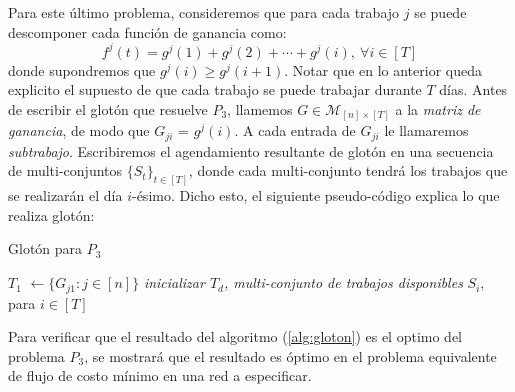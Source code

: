 \documentclass[10pt]{article}
\theoremstyle{plain}
\theoremstyle{definition}
\begin{document}
Para este último problema, consideremos que para cada trabajo $j$ se puede descomponer cada función de ganancia como:
\begin{equation}
\label{eq:desc}
f^j(t) = g^j(1) + g^j(2) + \cdots + g^j(i),\ \forall i \in [T]
\end{equation}
donde supondremos que $g^j(i)\geq g^j(i+1)$. Notar que en lo anterior queda explicito el supuesto de que cada trabajo se puede trabajar durante $T$ días. Antes de escribir el glotón que resuelve $P_3$, llamemos $G\in \mathcal{M}_{[n] \times [T]}$ a la \textit{matriz de ganancia}, de modo que $G_{ji}$ = $g^j(i)$. A cada entrada de $G_{ji}$ le llamaremos \textit{subtrabajo}. Escribiremos el agendamiento resultante de glotón en una secuencia de multi-conjuntos $\{S_t\}_{t \in [T]}$, donde cada multi-conjunto tendrá los trabajos que se realizarán el día $i$-ésimo. Dicho esto, el siguiente pseudo-código explica lo que realiza glotón: 



\begin{algorithm}

\caption{Glotón para $P_3$}
\label{alg:gloton}



\BlankLine


$T_1$ $\leftarrow \{G_{j1}:j\in [n]\}$ \emph{inicializar $T_d$, multi-conjunto de trabajos disponibles}\;
\For{$i\leftarrow 1$ \KwTo $T$}{
$S_{i}$ $\leftarrow$ los $m$ mejores subtrabajos de $T_t$\;
$T_{i+1}$ $\leftarrow$ $T_t\setminus{S_i} \cup \{G_{j,k+1}: \text{para $k\in [T]$, $j \in [n]$, tal que $G_{jk}\in S_{i}$}\}$\;
}
\Return $S_i$, para $i \in [T]$
\end{algorithm}
Para verificar que el resultado del algoritmo (\ref{alg:gloton}) es el optimo del problema $P_3$, se mostrará que el resultado es óptimo en el problema equivalente de flujo de costo mínimo en una red a especificar.\\~\\
\end{document}
